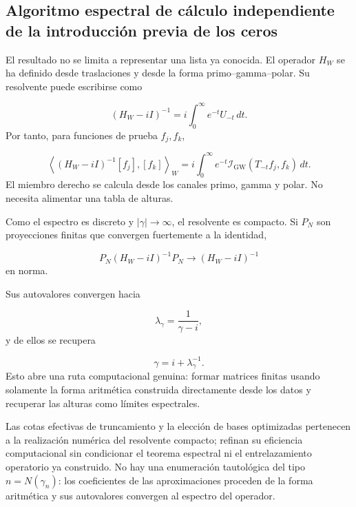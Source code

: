 \subsection{Algoritmo espectral de cálculo independiente de la introducción previa de los ceros}
El resultado no se limita a representar una lista ya conocida. El operador \(H_W\) se ha definido desde traslaciones y desde la forma primo–gamma–polar. Su resolvente puede escribirse como\par
\[
(H_W-iI)^{-1}
=
i\int_0^\infty
e^{-t}U_{-t}\,dt.
\]
Por tanto, para funciones de prueba \(f_j,f_k\),\par
\[
\left\langle
(H_W-iI)^{-1}[f_j],[f_k]
\right\rangle_W
=
i\int_0^\infty
e^{-t}
\mathscr I_{\mathrm{GW}}(T_{-t}f_j,f_k)\,dt.
\]
El miembro derecho se calcula desde los canales primo, gamma y polar. No necesita alimentar una tabla de alturas.\par
Como el espectro es discreto y \(|\gamma|\to\infty\), el resolvente es compacto. Si \(P_N\) son proyecciones finitas que convergen fuertemente a la identidad,\par
\[
P_N(H_W-iI)^{-1}P_N
\longrightarrow
(H_W-iI)^{-1}
\]
en norma.\par
Sus autovalores convergen hacia\par
\[
\lambda_\gamma
=
\frac1{\gamma-i},
\]
y de ellos se recupera\par
\[
\gamma=i+\lambda_\gamma^{-1}.
\]
Esto abre una ruta computacional genuina: formar matrices finitas usando solamente la forma aritmética construida directamente desde los datos y recuperar las alturas como límites espectrales.\par
Las cotas efectivas de truncamiento y la elección de bases optimizadas pertenecen a la realización numérica del resolvente compacto; refinan su eficiencia computacional sin condicionar el teorema espectral ni el entrelazamiento operatorio ya construido. No hay una enumeración tautológica del tipo \(n=N(\gamma_n)\): los coeficientes de las aproximaciones proceden de la forma aritmética y sus autovalores convergen al espectro del operador.\par
{}

